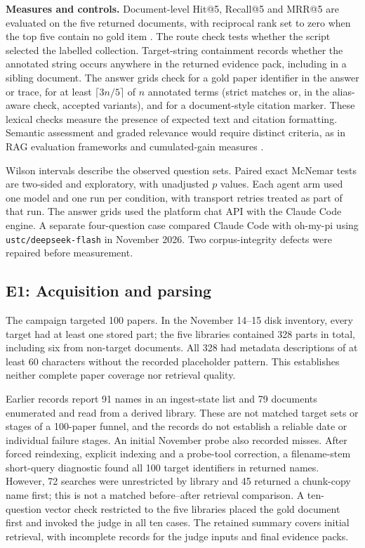 \textbf{Measures and controls.} Document-level Hit@5, Recall@5 and
MRR@5 are evaluated on the five returned documents, with reciprocal rank set
to zero when the top five contain no gold item \citep{craswell-msmarco-2021}.
The route check tests whether the script selected the labelled collection.
Target-string containment records whether the annotated string occurs
anywhere in the returned evidence pack, including in a sibling document.
The answer grids check for a gold paper identifier in the answer or trace,
for at least $\lceil 3n/5\rceil$ of $n$ annotated terms (strict matches or,
in the alias-aware check, accepted variants), and for a document-style
citation marker. These lexical checks measure the presence of expected
text and citation formatting. Semantic assessment and graded relevance
would require distinct criteria, as in RAG evaluation frameworks
\citep{es-ragas-2024,saad-falcon-ares-2024} and cumulated-gain measures
\citep{jarvelin-cumulated-gain-2002}.

Wilson intervals describe the observed question sets. Paired exact
McNemar tests are two-sided and exploratory, with unadjusted $p$ values.
Each agent arm used one model and one run per condition, with transport
retries treated as part of that run. The answer grids used the platform chat
API with the Claude Code engine. A separate four-question case compared
Claude Code with oh-my-pi using \texttt{ustc/deepseek-flash} in November
2026. Two corpus-integrity defects were repaired before measurement.

\subsection{E1: Acquisition and parsing}
\label{sec:e1}
The campaign targeted 100 papers. In the November 14--15 disk inventory,
every target had at least one stored part; the five libraries contained 328
parts in total, including six from non-target documents. All 328 had
metadata descriptions of at least 60 characters without the recorded
placeholder pattern. This establishes neither complete paper coverage nor
retrieval quality.

Earlier records report 91 names in an ingest-state list and 79 documents
enumerated and read from a derived library. These are not matched target
sets or stages of a 100-paper funnel, and the records do not establish a
reliable date or individual failure stages. An initial November probe also
recorded misses. After forced reindexing, explicit indexing and a probe-tool
correction, a filename-stem short-query diagnostic found all 100 target
identifiers in returned names. However, 72 searches were unrestricted by
library and 45 returned a chunk-copy name first; this is not a matched
before--after retrieval comparison. A ten-question vector check restricted to
the five libraries placed the gold document first and invoked the judge in
all ten cases. The retained summary covers initial retrieval, with
incomplete records for the judge inputs and final evidence packs.

